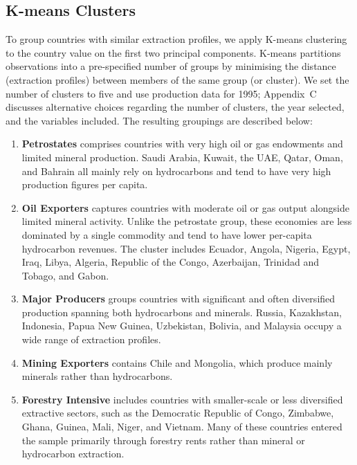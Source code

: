 \documentclass[12pt,a4paper]{report}
\begin{document}
\subsection{K-means Clusters}

To group countries with similar extraction profiles, we apply K-means clustering to the country value on the first two principal components. K-means partitions observations into a pre-specified number of groups by minimising the distance (extraction profiles) between members of the same group (or cluster). We set the number of clusters to five and use production data for 1995; Appendix~C discusses alternative choices regarding the number of clusters, the year selected, and the variables included. The resulting groupings are described below:

\begin{enumerate}
\item \textbf{Petrostates} comprises countries with very high oil or gas endowments and limited mineral production. Saudi Arabia, Kuwait, the UAE, Qatar, Oman, and Bahrain all mainly rely on hydrocarbons and tend to have very high production figures per capita.

\item \textbf{Oil Exporters} captures countries with moderate oil or gas output alongside limited mineral activity. Unlike the petrostate group, these economies are less dominated by a single commodity and tend to have lower per-capita hydrocarbon revenues. The cluster includes Ecuador, Angola, Nigeria, Egypt, Iraq, Libya, Algeria, Republic of the Congo, Azerbaijan, Trinidad and Tobago, and Gabon.

\item \textbf{Major Producers} groups countries with significant and often diversified production spanning both hydrocarbons and minerals. Russia, Kazakhstan, Indonesia, Papua New Guinea, Uzbekistan, Bolivia, and Malaysia occupy a wide range of extraction profiles.

\item \textbf{Mining Exporters} contains Chile and Mongolia, which produce mainly minerals rather than hydrocarbons.

\item \textbf{Forestry Intensive} includes countries with smaller-scale or less diversified extractive sectors, such as the Democratic Republic of Congo, Zimbabwe, Ghana, Guinea, Mali, Niger, and Vietnam. Many of these countries entered the sample primarily through forestry rents rather than mineral or hydrocarbon extraction.
\end{enumerate}
\end{document}

